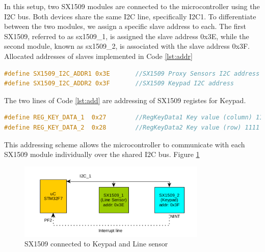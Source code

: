 \documentclass[english]{article}
\begin{document}
In this setup, two SX1509 modules are connected to the microcontroller using the I2C bus. 
Both devices share the same I2C line, specifically I2C1. To differentiate between the two modules,
we assign a specific slave address to each. 
The first SX1509, referred to as sx1509\_1, is assigned
  the slave address 0x3E, while the second module, known as sx1509\_2, is associated with the slave address 0x3F.
\\Allocated addresses of slaves implemented in Code \ref{lst:addr}
\begin{lstlisting}[language=C, caption={I2C Addresses}, label={lst:addr} ]
#define SX1509_I2C_ADDR1 0x3E       //SX1509 Proxy Sensors I2C address
#define SX1509_I2C_ADDR2 0x3F       //SX1509 Keypad I2C address
\end{lstlisting}
The two lines of Code \ref{lst:add} are addressing of SX1509 registes for Keypad.
\begin{lstlisting}[language=C, caption={Keypad Data registers}, label={lst:add} ]
#define REG_KEY_DATA_1  0x27        //RegKeyData1 Key value (column) 1111 1111
#define REG_KEY_DATA_2  0x28	    //RegKeyData2 Key value (row) 1111 1111
\end{lstlisting}
This addressing scheme allows the microcontroller to communicate with each SX1509 module individually over the shared I2C bus.
Figure \ref{fig:SX1509}
\begin{figure}[!h]
	\centering
	\includegraphics[width=0.80\textwidth,]{figures/SX.png}
	\caption{SX1509 connected to Keypad and Line sensor}
	\label{fig:SX1509}
\end{figure}
\end{document}
